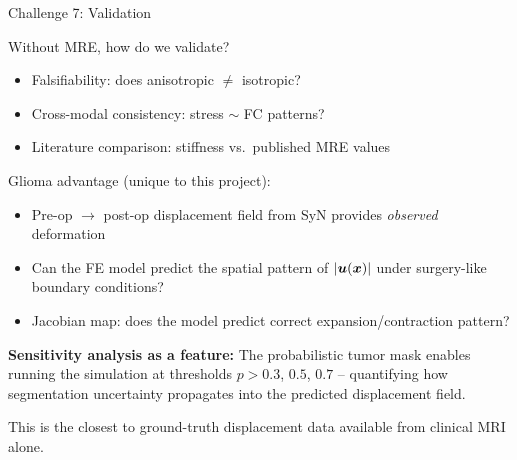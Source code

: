 \begin{frame}{Challenge 7: Validation}

  Without MRE, how do we validate?

  \bigskip

  \begin{itemize}
    \item Falsifiability: does anisotropic $\neq$ isotropic?
    \item Cross-modal consistency: stress $\sim$ FC patterns?
    \item Literature comparison: stiffness vs.\ published MRE values
  \end{itemize}

  \bigskip

  \alert{Glioma advantage} (unique to this project):
  \begin{itemize}
    \item Pre-op $\to$ post-op displacement field from SyN
      provides \emph{observed} deformation
    \item Can the FE model predict the spatial pattern of
      $|\bm{u}(\bm{x})|$ under surgery-like boundary conditions?
    \item Jacobian map: does the model predict correct
      expansion/contraction pattern?
  \end{itemize}

  \medskip

  \textbf{Sensitivity analysis as a feature:} The probabilistic tumor
  mask enables running the simulation at thresholds $p > 0.3$, $0.5$,
  $0.7$ -- quantifying how segmentation uncertainty propagates into
  the predicted displacement field.

  \medskip

  This is the closest to \alert{ground-truth displacement data}
  available from clinical MRI alone.

\end{frame}

